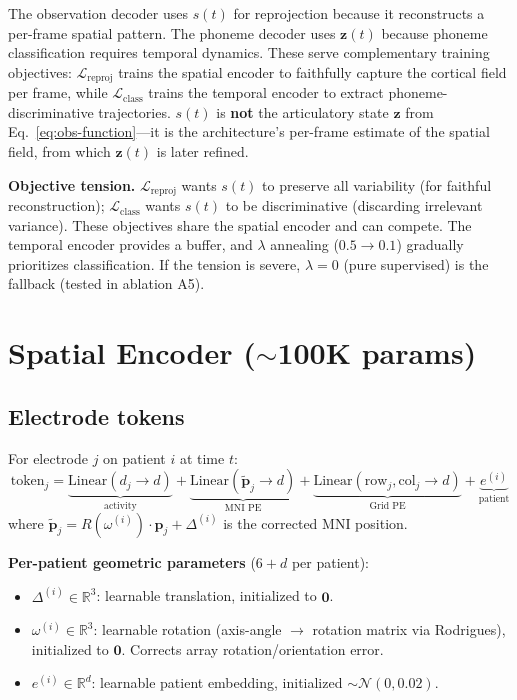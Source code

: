 \documentclass[11pt,letterpaper]{article}
\newcommand{\bfp}{\mathbf{p}}
\newcommand{\bfz}{\mathbf{z}}
\newcommand{\R}{\mathbb{R}}
\begin{document}
The observation decoder uses $s(t)$ for reprojection because it reconstructs a per-frame spatial pattern. The phoneme decoder uses $\bfz(t)$ because phoneme classification requires temporal dynamics. These serve complementary training objectives: $\mathcal{L}_{\text{reproj}}$ trains the spatial encoder to faithfully capture the cortical field per frame, while $\mathcal{L}_{\text{class}}$ trains the temporal encoder to extract phoneme-discriminative trajectories. $s(t)$ is \textbf{not} the articulatory state $\bfz$ from Eq.~\eqref{eq:obs-function}---it is the architecture's per-frame estimate of the spatial field, from which $\bfz(t)$ is later refined.

\textbf{Objective tension.} $\mathcal{L}_{\text{reproj}}$ wants $s(t)$ to preserve all variability (for faithful reconstruction); $\mathcal{L}_{\text{class}}$ wants $s(t)$ to be discriminative (discarding irrelevant variance). These objectives share the spatial encoder and can compete. The temporal encoder provides a buffer, and $\lambda$ annealing ($0.5 \to 0.1$) gradually prioritizes classification. If the tension is severe, $\lambda{=}0$ (pure supervised) is the fallback (tested in ablation A5).


\section{Spatial Encoder (${\sim}$100K params)}

\subsection{Electrode tokens}

For electrode $j$ on patient $i$ at time $t$:
\begin{equation}
\text{token}_j = \underbrace{\text{Linear}(d_j \to d)}_{\text{activity}} + \underbrace{\text{Linear}(\tilde{\bfp}_j \to d)}_{\text{MNI PE}} + \underbrace{\text{Linear}(\text{row}_j, \text{col}_j \to d)}_{\text{Grid PE}} + \underbrace{e^{(i)}}_{\text{patient}}
\end{equation}
where $\tilde{\bfp}_j = R(\omega^{(i)}) \cdot \bfp_j + \Delta^{(i)}$ is the corrected MNI position.

\textbf{Per-patient geometric parameters} ($6 + d$ per patient):
\begin{itemize}[leftmargin=2em]
\item $\Delta^{(i)} \in \R^3$: learnable translation, initialized to $\mathbf{0}$.
\item $\omega^{(i)} \in \R^3$: learnable rotation (axis-angle $\to$ rotation matrix via Rodrigues), initialized to $\mathbf{0}$. Corrects array rotation/orientation error.
\item $e^{(i)} \in \R^d$: learnable patient embedding, initialized $\sim \mathcal{N}(0, 0.02)$.
\end{itemize}
\end{document}
